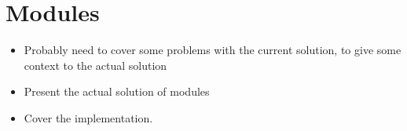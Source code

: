 \section{Modules}

\begin{itemize}
\item Probably need to cover some problems with the current solution, to give
some context to the actual solution
\item Present the actual solution of modules
\item Cover the implementation.
\end{itemize}

